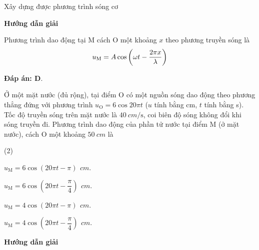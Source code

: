 \begin{dang}{Xây dựng được phương trình sóng cơ}
	{
		\begin{center}
			\textbf{Hướng dẫn giải}
		\end{center}
		
		Phương trình dao động tại M cách O một khoảng $x$ theo phương truyền sóng là $$u_\text M = A \cos \left(\omega t-\dfrac{2\pi x}{\lambda}\right)$$
		
		\textbf{Đáp án: D}.
	}
	
	{
		Ở một mặt nước (đủ rộng), tại điểm O có một nguồn sóng dao động theo phương thẳng đứng với phương trình ${u}_{\text{O}}=6\cos 20\pi t$ ($u$ tính bằng cm, $t$ tính bằng s). Tốc độ truyền sóng trên mặt nước là $\SI{40}{cm/\second}$, coi biên độ sóng không đổi khi sóng truyền đi. Phương trình dao động của phần tử nước tại điểm M (ở mặt nước), cách O một khoảng $\SI{50}{cm}$ là
		\begin{mcq}(2)
			\item ${{u}_{\text{M}}}=6\cos\left( 20\pi t-\pi\right)\,\SI{}{cm}$.
			\item ${{u}_{\text{M}}}=6\cos\left( 20\pi t-\dfrac{\pi }{4} \right)\,\SI{}{cm}$.
			\item ${{u}_{\text{M}}}=4\cos\left( 20\pi t-\pi \right)\,\SI{}{cm}$.
			\item ${{u}_{\text{M}}}=4\cos\left( 20\pi t-\dfrac{\pi }{4} \right)\,\SI{}{cm}$.
		\end{mcq}
	}{
		\begin{center}
			\textbf{Hướng dẫn giải}
		\end{center}
		
}
\end{dang}
